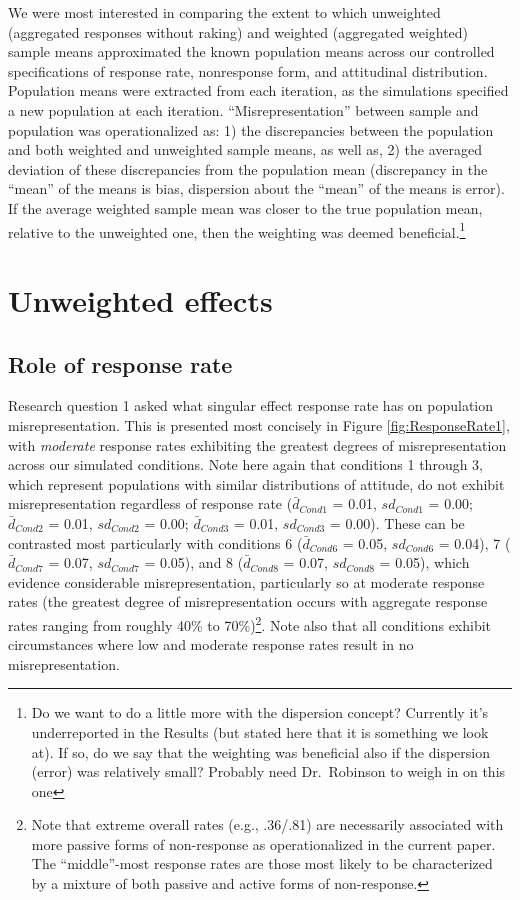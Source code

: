 \documentclass[
  man,mask]{apa7}
\begin{document}
We were most interested in comparing the extent to which unweighted (aggregated responses without raking) and weighted (aggregated weighted) sample means approximated the known population means across our controlled specifications of response rate, nonresponse form, and attitudinal distribution. Population means were extracted from each iteration, as the simulations specified a new population at each iteration. ``Misrepresentation'' between sample and population was operationalized as: 1) the discrepancies between the population and both weighted and unweighted sample means, as well as, 2) the averaged deviation of these discrepancies from the population mean (discrepancy in the ``mean'' of the means is bias, dispersion about the ``mean'' of the means is error). If the average weighted sample mean was closer to the true population mean, relative to the unweighted one, then the weighting was deemed beneficial.\footnote{Do we want to do a little more with the dispersion concept? Currently it's underreported in the Results (but stated here that it is something we look at). If so, do we say that the weighting was beneficial also if the dispersion (error) was relatively small? Probably need Dr.~Robinson to weigh in on this one}

\section{Unweighted effects}\label{unweighted-effects}

\subsection{Role of response rate}\label{role-of-response-rate}

Research question 1 asked what singular effect response rate has on population misrepresentation. This is presented most concisely in Figure \ref{fig:ResponseRate1}, with \emph{moderate} response rates exhibiting the greatest degrees of misrepresentation across our simulated conditions. Note here again that conditions 1 through 3, which represent populations with similar distributions of attitude, do not exhibit misrepresentation regardless of response rate (\(\bar{d}_{Cond1}\) = 0.01, \(sd_{Cond1}\) = 0.00; \(\bar{d}_{Cond2}\) = 0.01, \(sd_{Cond2}\) = 0.00; \(\bar{d}_{Cond3}\) = 0.01, \(sd_{Cond3}\) = 0.00). These can be contrasted most particularly with conditions 6 (\(\bar{d}_{Cond6}\) = 0.05, \(sd_{Cond6}\) = 0.04), 7 (\(\bar{d}_{Cond7}\) = 0.07, \(sd_{Cond7}\) = 0.05), and 8 (\(\bar{d}_{Cond8}\) = 0.07, \(sd_{Cond8}\) = 0.05), which evidence considerable misrepresentation, particularly so at moderate response rates (the greatest degree of misrepresentation occurs with aggregate response rates ranging from roughly 40\% to 70\%)\footnote{Note that extreme overall rates (e.g., .36/.81) are necessarily associated with more passive forms of non-response as operationalized in the current paper. The ``middle''-most response rates are those most likely to be characterized by a mixture of both passive and active forms of non-response.}. Note also that all conditions exhibit circumstances where low and moderate response rates result in no misrepresentation.
\end{document}
